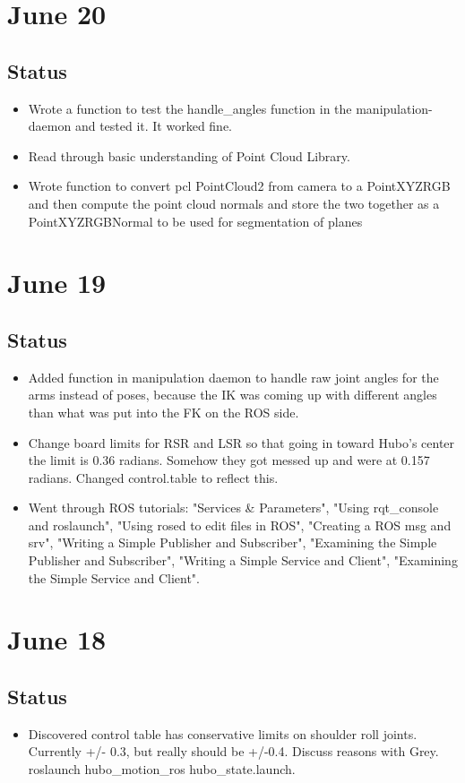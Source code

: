 \documentclass[letterpaper, 10 pt]{report}
\begin{document}
\section*{June 20}
\subsection*{Status}
\begin{itemize}
\item Wrote a function to test the handle\_angles function in the manipulation-daemon and tested it. It worked fine.
\item Read through basic understanding of Point Cloud Library.
\item Wrote function to convert pcl PointCloud2 from camera to a PointXYZRGB and then compute the point cloud normals and store the two together as a PointXYZRGBNormal to be used for segmentation of planes
\end{itemize}

\section*{June 19}
\subsection*{Status}
\begin{itemize}
\item Added function in manipulation daemon to handle raw joint angles for the arms instead of poses, because the IK was coming up with different angles than what was put into the FK on the ROS side.
\item Change board limits for RSR and LSR so that going in toward Hubo's center the limit is 0.36 radians. Somehow they got messed up and were at 0.157 radians. Changed control.table to reflect this.
\item Went through ROS tutorials: "Services \& Parameters", "Using rqt\_console and roslaunch", "Using rosed to edit files in ROS", "Creating a ROS msg and srv", "Writing a Simple Publisher and Subscriber", "Examining the Simple Publisher and Subscriber", "Writing a Simple Service and Client", "Examining the Simple Service and Client".
\end{itemize}

\section*{June 18}
\subsection*{Status}
\begin{itemize}
\item Discovered control table has conservative limits on shoulder roll joints. Currently +/- 0.3, but really should be +/-0.4. Discuss reasons with Grey.
roslaunch hubo\_motion\_ros hubo\_state.launch.
\end{itemize}
\end{document}
